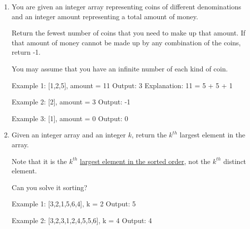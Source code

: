 \begin{enumerate}
You must implement an algorithm that runs in O(n) time and uses O(1) auxiliary space.

\begin{console}
Example 1: [1,2,0]
Output:    3
Explanation: The numbers in the range [1,2] are all in the array.

Example 2: [3,4,-1,1]
Output:    2
Explanation: 1 is in the array but 2 is missing.

Example 3: [7,8,9,11,12]
Output:    1
Explanation: The smallest positive integer 1 is missing.
\end{console}\newpage

\item {}

You are given an integer array representing coins of different denominations and an integer amount representing a total amount of money.

Return the fewest number of coins that you need to make up that amount. If that amount of money cannot be made up by any combination of the coins, return -1.

You may assume that you have an infinite number of each kind of coin.
\begin{console}
Example 1: [1,2,5], amount = 11
Output:    3
Explanation: 11 = 5 + 5 + 1

Example 2: [2], amount = 3
Output:    -1

Example 3: [1], amount = 0
Output:    0
\end{console}\newpage

\item {}

Given an integer array and an integer $k$, return the $k^{th}$ largest element in the array.

Note that it is the $k^{th}$ \underline{largest element in the sorted order}, not the $k^{th}$ distinct element.

Can you solve it  sorting?

\begin{console}
Example 1: [3,2,1,5,6,4], k = 2
Output:    5

Example 2: [3,2,3,1,2,4,5,5,6], k = 4
Output:    4
\end{console}\newpage


\end{enumerate}
